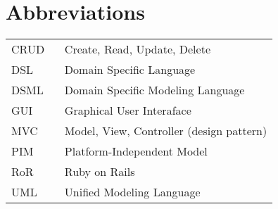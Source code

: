 \chapter*{Abbreviations}

\begin{flushleft}
\begin{tabular}{l p{0.8\linewidth}}
CRUD      & Create, Read, Update, Delete\\
DSL       & Domain Specific Language\\
DSML      & Domain Specific Modeling Language\\
GUI       & Graphical User Interaface\\
MVC       & Model, View, Controller (design pattern)\\
PIM       & Platform-Independent Model\\
RoR       & Ruby on Rails\\
UML       & Unified Modeling Language\\
\end{tabular}
\end{flushleft}

